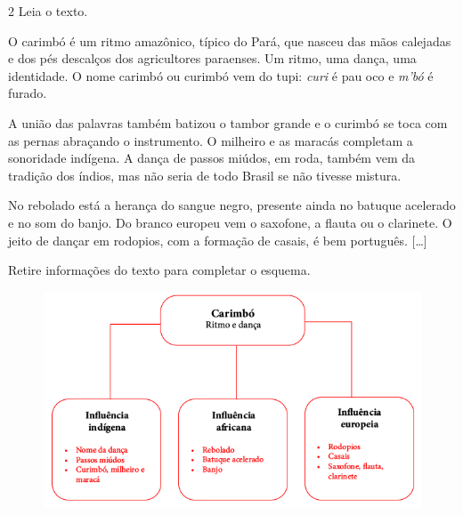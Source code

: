 \num{2}  Leia o texto.

\begin{myquote}
O carimbó é um ritmo amazônico, típico do Pará, que nasceu das mãos
calejadas e dos pés descalços dos agricultores paraenses. Um ritmo, uma
dança, uma identidade. O nome carimbó ou curimbó vem do tupi:
\emph{curi} é pau oco e \emph{m'bó} é furado.

A união das palavras também batizou o tambor grande e o curimbó se toca
com as pernas abraçando o instrumento. O milheiro e as maracás completam
a sonoridade indígena. A dança de passos miúdos, em roda, também vem da
tradição dos índios, mas não seria de todo Brasil se não tivesse
mistura.

No rebolado está a herança do sangue negro, presente ainda no batuque
acelerado e no som do banjo. Do branco europeu vem o saxofone, a flauta
ou o clarinete. O jeito de dançar em rodopios, com a formação de casais,
é bem português.
{[}\ldots{}{]}

\end{myquote}

\noindent{}Retire informações do texto para completar o esquema.

\begin{figure}[htpb!]
\includegraphics[width=\textwidth]{../ilustracoes/ART5/SAEB_5ANO_ART_FIGURA3.png}
\end{figure}


